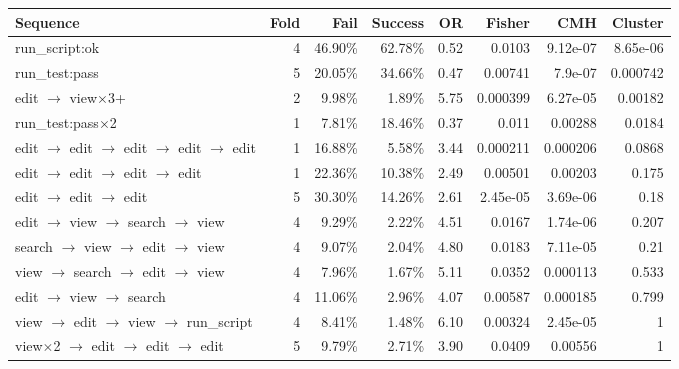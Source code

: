 \begin{tabular}{lrrrrrrr}
\toprule
Sequence & Fold & Fail & Success & OR & Fisher & CMH & Cluster \\
\midrule
run\_script:ok & 4 & 46.90\% & 62.78\% & 0.52 & 0.0103 & 9.12e-07 & 8.65e-06 \\
run\_test:pass & 5 & 20.05\% & 34.66\% & 0.47 & 0.00741 & 7.9e-07 & 0.000742 \\
edit $\to$ view$\times$3+ & 2 & 9.98\% & 1.89\% & 5.75 & 0.000399 & 6.27e-05 & 0.00182 \\
run\_test:pass$\times$2 & 1 & 7.81\% & 18.46\% & 0.37 & 0.011 & 0.00288 & 0.0184 \\
edit $\to$ edit $\to$ edit $\to$ edit $\to$ edit & 1 & 16.88\% & 5.58\% & 3.44 & 0.000211 & 0.000206 & 0.0868 \\
edit $\to$ edit $\to$ edit $\to$ edit & 1 & 22.36\% & 10.38\% & 2.49 & 0.00501 & 0.00203 & 0.175 \\
edit $\to$ edit $\to$ edit & 5 & 30.30\% & 14.26\% & 2.61 & 2.45e-05 & 3.69e-06 & 0.18 \\
edit $\to$ view $\to$ search $\to$ view & 4 & 9.29\% & 2.22\% & 4.51 & 0.0167 & 1.74e-06 & 0.207 \\
search $\to$ view $\to$ edit $\to$ view & 4 & 9.07\% & 2.04\% & 4.80 & 0.0183 & 7.11e-05 & 0.21 \\
view $\to$ search $\to$ edit $\to$ view & 4 & 7.96\% & 1.67\% & 5.11 & 0.0352 & 0.000113 & 0.533 \\
edit $\to$ view $\to$ search & 4 & 11.06\% & 2.96\% & 4.07 & 0.00587 & 0.000185 & 0.799 \\
view $\to$ edit $\to$ view $\to$ run\_script & 4 & 8.41\% & 1.48\% & 6.10 & 0.00324 & 2.45e-05 & 1 \\
view$\times$2 $\to$ edit $\to$ edit $\to$ edit & 5 & 9.79\% & 2.71\% & 3.90 & 0.0409 & 0.00556 & 1 \\
\bottomrule
\end{tabular}

